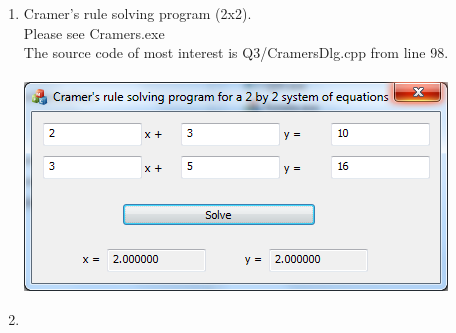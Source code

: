 \documentclass{article}
\begin{document}
\begin{enumerate}
\item Cramer's rule solving program (2x2). \\
Please see Cramers.exe \\
The source code of most interest is Q3/CramersDlg.cpp from line 98. \\
\\
\includegraphics{Cramers}
\\

\item

\end{enumerate}
\end{document}
